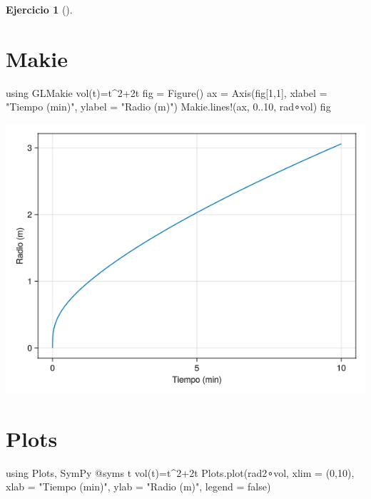 \documentclass[
  a4paper,
]{scrreport}
\newenvironment{Shaded}{\begin{snugshade}}{\end{snugshade}}
\newcommand{\BuiltInTok}[1]{\textcolor[rgb]{0.00,0.23,0.31}{#1}}
\newcommand{\ConstantTok}[1]{\textcolor[rgb]{0.56,0.35,0.01}{#1}}
\newcommand{\FloatTok}[1]{\textcolor[rgb]{0.68,0.00,0.00}{#1}}
\newcommand{\FunctionTok}[1]{\textcolor[rgb]{0.28,0.35,0.67}{#1}}
\newcommand{\ImportTok}[1]{\textcolor[rgb]{0.00,0.46,0.62}{#1}}
\newcommand{\NormalTok}[1]{\textcolor[rgb]{0.00,0.23,0.31}{#1}}
\newcommand{\OperatorTok}[1]{\textcolor[rgb]{0.37,0.37,0.37}{#1}}
\newcommand{\PreprocessorTok}[1]{\textcolor[rgb]{0.68,0.00,0.00}{#1}}
\newcommand{\StringTok}[1]{\textcolor[rgb]{0.13,0.47,0.30}{#1}}
\theoremstyle{definition}
\newtheorem{exercise}{Ejercicio}[chapter]
\theoremstyle{remark}
\begin{document}
\begin{exercise}[]
\begin{enumerate}
\begin{tcolorbox}
  \section{Makie}

\begin{Shaded}
\begin{Highlighting}[]
\ImportTok{using} \BuiltInTok{GLMakie}
\FunctionTok{vol}\NormalTok{(t)}\OperatorTok{=}\NormalTok{t}\OperatorTok{\^{}}\FloatTok{2}\OperatorTok{+}\FloatTok{2}\NormalTok{t}
\NormalTok{fig }\OperatorTok{=} \FunctionTok{Figure}\NormalTok{()}
\NormalTok{ax }\OperatorTok{=} \FunctionTok{Axis}\NormalTok{(fig[}\FloatTok{1}\NormalTok{,}\FloatTok{1}\NormalTok{], xlabel }\OperatorTok{=} \StringTok{"Tiempo (min)"}\NormalTok{, ylabel }\OperatorTok{=} \StringTok{"Radio (m)"}\NormalTok{)}
\NormalTok{Makie.}\FunctionTok{lines!}\NormalTok{(ax, }\FloatTok{0}\OperatorTok{..}\FloatTok{10}\NormalTok{, rad}\OperatorTok{∘}\NormalTok{vol)}
\NormalTok{fig}
\end{Highlighting}
\end{Shaded}

  \includegraphics{03-funciones-elementales_files/figure-pdf/cell-15-output-1.png}

  \section{Plots}

\begin{Shaded}
\begin{Highlighting}[]
\ImportTok{using} \BuiltInTok{Plots}\NormalTok{, }\BuiltInTok{SymPy}
\PreprocessorTok{@syms}\NormalTok{ t}
\FunctionTok{vol}\NormalTok{(t)}\OperatorTok{=}\NormalTok{t}\OperatorTok{\^{}}\FloatTok{2}\OperatorTok{+}\FloatTok{2}\NormalTok{t}
\NormalTok{Plots.}\FunctionTok{plot}\NormalTok{(rad2}\OperatorTok{∘}\NormalTok{vol, xlim }\OperatorTok{=}\NormalTok{ (}\FloatTok{0}\NormalTok{,}\FloatTok{10}\NormalTok{), xlab }\OperatorTok{=} \StringTok{"Tiempo (min)"}\NormalTok{, ylab }\OperatorTok{=} \StringTok{"Radio (m)"}\NormalTok{, legend }\OperatorTok{=} \ConstantTok{false}\NormalTok{)}
\end{Highlighting}
\end{Shaded}


\end{tcolorbox}
\end{enumerate}
\end{exercise}
\end{document}
